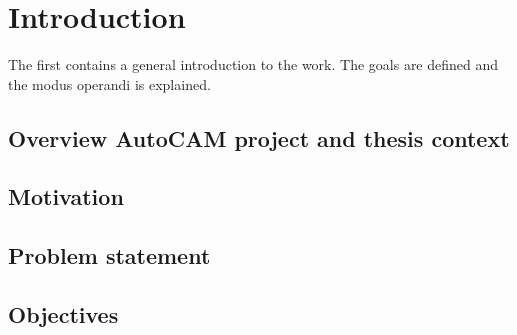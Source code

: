 \chapter{Introduction}
\label{cha:intro}
The first contains a general introduction to the work. The goals are
defined and the modus operandi is explained.

\section{Overview AutoCAM project and thesis context}


\section{Motivation}

\section{Problem statement}

\section{Objectives}